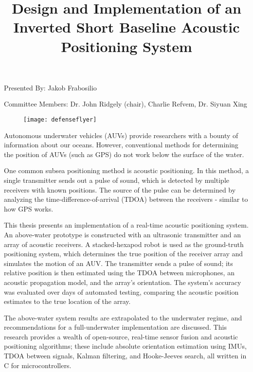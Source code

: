 \documentclass[12pt,a4paper]{article}
\title{\textbf{\Large Design and Implementation of an \\ Inverted Short Baseline Acoustic Positioning System}}
\author{}
\date{}
\newcommand{\subtitle}[1]{
	\vspace{-0.5em}
	{\color{subtitlecolor}\normalsize#1\par}
	\vspace{0.5em}
}
\begin{document}
	
	\maketitle
	\thispagestyle{empty}
	
	\vspace{-8em}
	
	{\normalsize Presented By: Jakob Frabosilio}
	
	\vspace{.5em}
	
	\subtitle{Committee Members: Dr. John Ridgely (chair), Charlie Refvem, Dr. Siyuan Xing}
	
	\begin{figure}[htbp]
		\centering
		\texttt{[image: defenseflyer]}
	\end{figure}
	
	\begin{flushleft}
		Autonomous underwater vehicles (AUVs) provide researchers with a bounty of information about our oceans. However, conventional methods for determining the position of AUVs (such as GPS) do not work below the surface of the water. 
		
		\vspace{.5em}
		
		One common subsea positioning method is acoustic positioning. In this method, a single transmitter sends out a pulse of sound, which is detected by multiple receivers with known positions. The source of the pulse can be determined by analyzing the time-difference-of-arrival (TDOA) between the receivers - similar to how GPS works.
		
		\vspace{.5em}
		
		This thesis presents an implementation of a real-time acoustic positioning system. An above-water prototype is constructed with an ultrasonic transmitter and an array of acoustic receivers. A stacked-hexapod robot is used  as the ground-truth positioning system, which determines the true position of the receiver array and simulates the motion of an AUV. The transmitter sends a pulse of sound; its relative position is then estimated using the TDOA between microphones, an acoustic propagation model, and the array's orientation. The system's accuracy was evaluated over days of automated testing, comparing the acoustic position estimates to the true location of the array.
		
		\vspace{.5em}
		
		The above-water system results are extrapolated to the underwater regime, and recommendations for a full-underwater implementation are discussed. This research provides a wealth of open-source, real-time sensor fusion and acoustic positioning algorithms; these include absolute orientation estimation using IMUs, TDOA between signals, Kalman filtering, and Hooke-Jeeves search, all written in C for microcontrollers.
		
	\end{flushleft}
	
\end{document}
